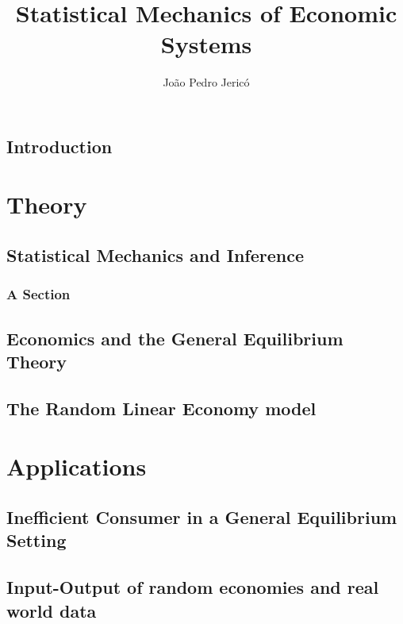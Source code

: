 \documentclass[
  oneside,
  11pt, a4paper,
  footinclude=true,
  headinclude=true,
  cleardoublepage=empty
]{scrbook}
\title{Statistical Mechanics of Economic Systems}
\author{João Pedro Jericó}
\begin{document}
\maketitle







\chapter{Introduction}




\part{Theory}


\chapter{Statistical Mechanics and Inference}

\section{A Section}

\chapter{Economics and the General Equilibrium Theory}



\chapter{The Random Linear Economy model}
\label{cha:RLE}



\part{Applications}

\chapter{Inefficient Consumer in a General Equilibrium Setting}

\chapter{Input-Output of random economies and real world data}
\end{document}
